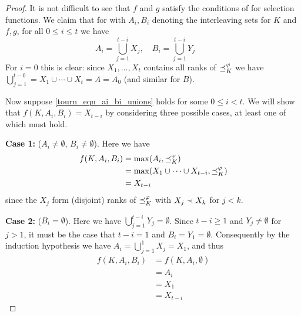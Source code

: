 \begin{proof}

    It is not difficult to see that $f$ and $g$ satisfy the conditions of
     for selection functions. We claim that for
    with $A_i, B_i$ denoting the interleaving sets for $K$ and $f, g$, for
    all $0 \le i \le t$ we have
    \begin{equation}
        \label{tourn_eqn_ai_bi_unions}
        A_i = \bigcup_{j=1}^{t - i}{X_j},
        \quad
        B_i = \bigcup_{j=1}^{t - i}{Y_j}
        \quad
        \quad
    \end{equation}
    For $i = 0$ this is clear: since $X_1,\ldots,X_t$ contains all ranks of
    ${\preceq_K^\varphi}$ we have $\bigcup_{j=1}^{t-0} = X_1 \cup \cdots \cup X_t = A
    = A_0$ (and similar for $B$).

    Now suppose \cref{tourn_eqn_ai_bi_unions} holds for some $0 \le i < t$. We
    will show that $f(K, A_i, B_i) = X_{t-i}$ by considering three possible
    cases, at least one of which must hold.

    \textbf{Case 1:} ($A_i \ne \emptyset$, $B_i \ne \emptyset$). Here we have
    \begin{align*}
        f(K, A_i, B_i)
        &= \max(A_i, {\preceq_K^\varphi}) \\
        &= \max(X_1 \cup \cdots \cup X_{t-i}, {\preceq_K^\varphi}) \\
        &= X_{t-i}
    \end{align*}
    since the $X_j$ form (disjoint) ranks of ${\preceq_K^\varphi}$ with $X_{j} \prec
    X_{k}$ for $j < k$.

    \textbf{Case 2:} ($B_i = \emptyset$). Here we have
    $\bigcup_{j=1}^{t-i}{Y_j} = \emptyset$. Since $t - i \ge 1$ and $Y_j \ne
    \emptyset$ for $j > 1$, it must be the case that $t - i = 1$ and $B_i = Y_1
    = \emptyset$. Consequently by the induction hypothesis we have $A_i =
    \bigcup_{j=1}^{1}{X_j} = X_1$, and thus
    \begin{align*}
        f(K, A_i, B_i)
        &= f(K, A_i, \emptyset) \\
        &= A_i \\
        &= X_1 \\
        &= X_{t-i}
    \end{align*}


\end{proof}
